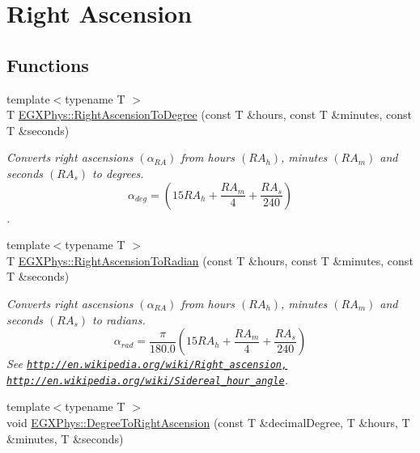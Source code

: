 \hypertarget{group___e_g_x_phys-_astrophysics-_right_ascension}{}\section{Right Ascension}
\label{group___e_g_x_phys-_astrophysics-_right_ascension}
\subsection*{Functions}
\begin{DoxyCompactItemize}
\item 
{\footnotesize template$<$typename T $>$ }\\T \mbox{\hyperlink{group___e_g_x_phys-_astrophysics-_right_ascension_ga30e95e529dac871efc014c8ca0108c0d}{E\+G\+X\+Phys\+::\+Right\+Ascension\+To\+Degree}} (const T \&hours, const T \&minutes, const T \&seconds)
\begin{DoxyCompactList}\small\item\em Converts right ascensions $(\alpha_{RA})$ from hours $(RA_h)$, minutes $(RA_m)$ and seconds $(RA_s)$ to degrees. \[\alpha_{deg}=(15 RA_h + \frac{RA_m}{4} + \frac{RA_s}{240})\]. \end{DoxyCompactList}\item 
{\footnotesize template$<$typename T $>$ }\\T \mbox{\hyperlink{group___e_g_x_phys-_astrophysics-_right_ascension_gad90de181361375b745a9b226fa13ba14}{E\+G\+X\+Phys\+::\+Right\+Ascension\+To\+Radian}} (const T \&hours, const T \&minutes, const T \&seconds)
\begin{DoxyCompactList}\small\item\em Converts right ascensions $(\alpha_{RA})$ from hours $(RA_h)$, minutes $(RA_m)$ and seconds $(RA_s)$ to radians. \[\alpha_{rad}=\frac{\pi}{180.0}(15 RA_h + \frac{RA_m}{4} + \frac{RA_s}{240})\] See \href{http://en.wikipedia.org/wiki/Right_ascension,}{\tt http\+://en.\+wikipedia.\+org/wiki/\+Right\+\_\+ascension,} \href{http://en.wikipedia.org/wiki/Sidereal_hour_angle}{\tt http\+://en.\+wikipedia.\+org/wiki/\+Sidereal\+\_\+hour\+\_\+angle}. \end{DoxyCompactList}\item 
{\footnotesize template$<$typename T $>$ }\\void \mbox{\hyperlink{group___e_g_x_phys-_astrophysics-_right_ascension_gabdd9d1c686dd5e2580518f526b78295f}{E\+G\+X\+Phys\+::\+Degree\+To\+Right\+Ascension}} (const T \&decimal\+Degree, T \&hours, T \&minutes, T \&seconds)

\end{DoxyCompactItemize}
